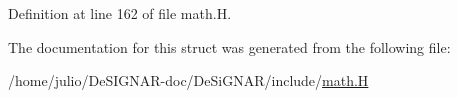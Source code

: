 Definition at line 162 of file math.\+H.



The documentation for this struct was generated from the following file\+:\begin{DoxyCompactItemize}
\item 
/home/julio/\+De\+S\+I\+G\+N\+A\+R-\/doc/\+De\+Si\+G\+N\+A\+R/include/\hyperlink{math_8_h}{math.\+H}\end{DoxyCompactItemize}
